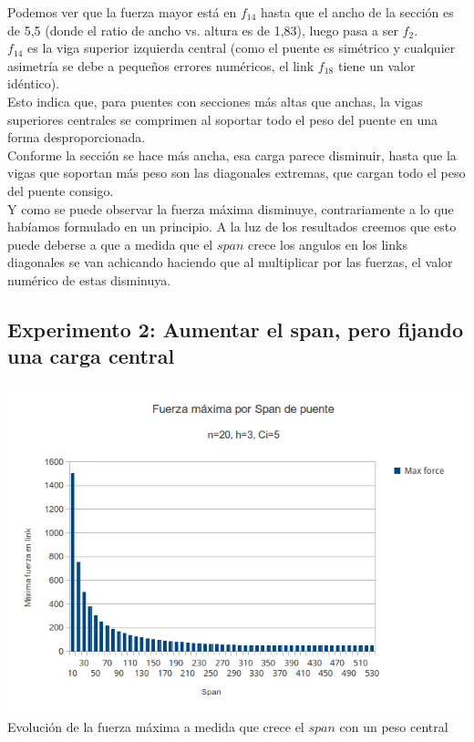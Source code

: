 Podemos ver que la fuerza mayor está en $f_{14}$ hasta que el ancho de la sección es de 5,5 (donde el ratio de ancho vs. altura es de 1,83), luego pasa a ser $f_2$.\\

$f_{14}$ es la viga superior izquierda central (como el puente es simétrico y cualquier asimetría se debe a pequeños errores numéricos, el link $f_{18}$ tiene un valor idéntico).\\

Esto indica que, para puentes con secciones más altas que anchas, la vigas superiores centrales se comprimen al soportar todo el peso del puente en una forma desproporcionada.\\

Conforme la sección se hace más ancha, esa carga parece disminuir, hasta que la vigas que soportan más peso son las diagonales extremas, que cargan todo el peso del puente consigo.\\

Y como se puede observar la fuerza máxima disminuye, contrariamente a lo que habíamos formulado en un principio. A la luz de los resultados creemos que esto puede deberse a que a medida que el $span$ crece los angulos en los links diagonales se van achicando haciendo que al multiplicar por las fuerzas, el valor numérico de estas disminuya.

\subsection{Experimento 2: Aumentar el span, pero fijando una carga central}

\begin{center}
\includegraphics[scale=0.8]{archivos/graficos/Fuerza-x-span2.png}\\
Evolución de la fuerza máxima a medida que crece el $span$ con un peso central
\end{center}
